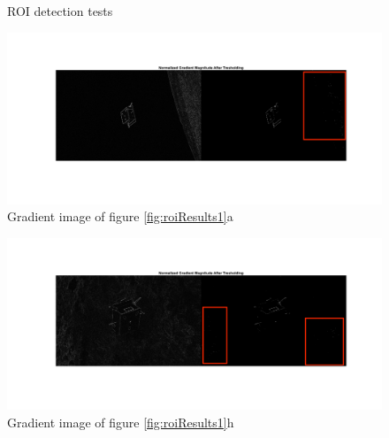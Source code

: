 \begin{figure}[htbp]
  \qquad
  \qquad
  \qquad
  \qquad
  \caption{ROI detection tests}
  \label{fig:roiResults2}
\end{figure}

\begin{figure}[htbp]
  \centering
  \includegraphics[width=1.0\textwidth]{gfx/results/prisma/101/8Select.png}
  \caption{Gradient image of figure \ref{fig:roiResults1}a}
\end{figure}

\begin{figure}[htbp]
  \centering
  \includegraphics[width=1.0\textwidth]{gfx/results/prisma/117/8Select.png}
  \caption{Gradient image of figure \ref{fig:roiResults1}h}
\end{figure}

